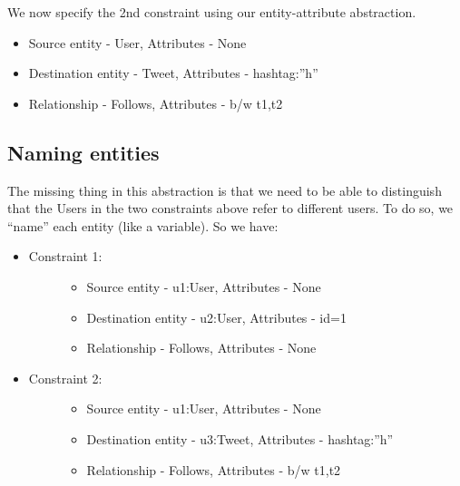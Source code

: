 \documentclass[letterpaper,10pt,english]{sphinxmanual}
\begin{document}
We now specify the 2nd constraint using our entity-attribute abstraction.
\begin{itemize}
\item {} 
Source entity - User, Attributes - None

\item {} 
Destination entity - Tweet, Attributes - hashtag:”h”

\item {} 
Relationship - Follows, Attributes - b/w t1,t2

\end{itemize}


\subsection{Naming entities}
\label{\detokenize{neo4j_query_generation:naming-entities}}
The missing thing in this abstraction is that we need to be able to distinguish that the Users in the two constraints above refer to different users. To do so, we “name” each entity (like a variable). So we have:
\begin{itemize}
\item {} \begin{description}
\item[{Constraint 1:}] \leavevmode\begin{itemize}
\item {} 
Source entity - u1:User, Attributes - None

\item {} 
Destination entity - u2:User, Attributes - id=1

\item {} 
Relationship - Follows, Attributes - None

\end{itemize}

\end{description}

\item {} \begin{description}
\item[{Constraint 2:}] \leavevmode\begin{itemize}
\item {} 
Source entity - u1:User, Attributes - None

\item {} 
Destination entity - u3:Tweet, Attributes - hashtag:”h”

\item {} 
Relationship - Follows, Attributes - b/w t1,t2

\end{itemize}

\end{description}

\end{itemize}
\end{document}
